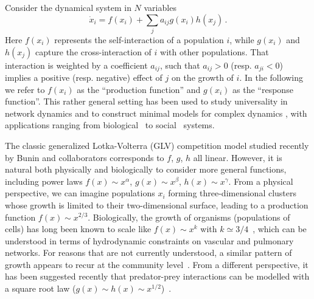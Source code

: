 
Consider the dynamical system in $N$ variables
\begin{equation}\label{dynamics}
    \dot{x}_i = f(x_i) + \sum_{j}a_{ij}g(x_i)h(x_j) \, .
\end{equation}
Here $f(x_i)$ represents the self-interaction of a population $i$, while $g(x_i)$ and $h(x_j)$ capture the cross-interaction of $i$ with other populations. That interaction is weighted by a coefficient $a_{ij}$, such that $a_{ij} > 0$ (resp.
$a_{ji} < 0$) implies a positive (resp.
negative) effect of $j$ on the growth of $i$.
In the following we refer to $f(x_i)$ as the ``production function'' and $g(x_i)$ as the ``response function''.
This rather general setting has been used to study universality in network dynamics \cite{Barzel2013} and to construct minimal models for complex dynamics \cite{Barzel2015}, with applications ranging from biological~\cite{Alon2006,Karlebach2008,Skinner2012} 
to social~\cite{Pastor-Satorras2001,Hufnagel2004,Dodds2005} systems.

The classic generalized Lotka-Volterra (GLV) competition model studied recently by Bunin and collaborators \cite{bunin2017ecological, biroli2018marginally} corresponds to $f$, $g$, $h$ all linear. 
However, it is natural both physically and biologically to consider more general functions, including power laws $f(x)\sim x^\alpha$, $g(x)\sim x^\beta$, $h(x) \sim x^\gamma$.
From a physical perspective, we can imagine populations $x_i$ forming three-dimensional clusters whose growth is limited to their two-dimensional surface, leading to a production function $f(x) \sim x^{2/3}$.
Biologically, the growth of organisms (populations of cells) has long been known to scale like $f(x) \sim x^k$ with $k\simeq 3/4$~\cite{Brown2004}, which can be understood in terms of hydrodynamic constraints on vascular and pulmonary networks.
For reasons that are not currently understood, a similar pattern of growth appears to recur at the community level~\cite{Hatton2015,Hatton2023}.
From a different perspective, it has been suggested recently that predator-prey interactions can be modelled with a square root law ($g(x) \sim h(x) \sim x^{1/2}$)~\cite{Barbier2021,Mazzarisi2023}.

